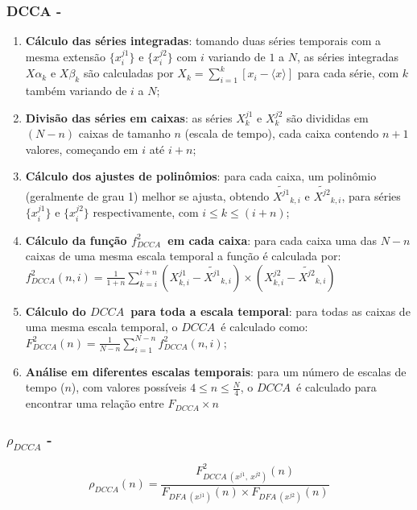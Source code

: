 \documentclass[11pt, aspectratio=169]{beamer}
\newcommand{\pdcca}{\({\rho}_{DCCA}\) }
\newcommand{\dcca}{$DCCA$}
\begin{document}
\begin{frame}[allowframebreaks]
\frametitle{DCCA - \cite{Podobnik2008}}
\begin{enumerate}
    \item \textbf{Cálculo das séries integradas}: tomando duas séries temporais com a mesma extensão $\{x^{j1}_{i}\}$ e $\{x^{j2}_{i}\}$ com $i$ variando de $1$ a $N$,
          as séries integradas $X\alpha_{k}$ e $X\beta_{k}$ são calculadas por
          $X_{k} = \sum_{i=1}^{k}\left[x_{i} - \langle x \rangle \right] $ para cada série, com $k$ também variando de $i$ a $N$;
    \item \textbf{Divisão das séries em caixas}: as séries $X^{j1}_{k}$ e $X^{j2}_{k}$ são divididas em $(N - n)$ caixas de tamanho $n$ (escala de tempo), cada caixa contendo $n + 1$ valores, começando em $i$ até $i + n$;
    \item \textbf{Cálculo dos ajustes de polinômios}: para cada caixa, um polinômio (geralmente de grau 1) melhor se ajusta, obtendo
          $\widetilde{X^{j1}}_{k, i}$ e $\widetilde{X^{j2}}_{k, i}$,
          para séries $\{x^{j1}_{i}\}$ e $\{x^{j2}_{i}\}$ respectivamente,
          com $i \le k \le (i + n)$;
    \item \textbf{Cálculo da função $f_{DCCA}^{2}$~em cada caixa}: para cada caixa uma das $N - n$ caixas de uma mesma escala temporal a função é calculada por:\\[5pt]
     $f_{DCCA}^{2}(n, i) =
            \frac{1}{1+n} \sum_{k=i}^{i + n}(X^{j1}_{k,i}-\widetilde{X^{j1}}_{k, i}) \times (X^{j2}_{k,i}-\widetilde{X^{j2}}_{k, i})$
    \item \textbf{Cálculo do \dcca~para toda a escala temporal}: para todas as caixas de uma mesma escala temporal, o \dcca~é calculado como:\\[5pt]
          $F^2_{DCCA}(n) = \frac{1}{N - n} \sum_{i=1}^{N-n} f_{DCCA}^{2}(n, i)$;
    \item \textbf{Análise em diferentes escalas temporais}: para um número de escalas de tempo ($n$), com valores possíveis $4 \le n \le \frac{N}{4}$, o \dcca~é calculado para encontrar uma relação entre $F_{DCCA} \times n$

\end{enumerate}

\end{frame}

\begin{frame}
\frametitle{\pdcca - \cite{Zebende2011}}

\begin{equation}
  {\rho}_{DCCA}(n) = \frac{F_{DCCA~(x^{j1},~x^{j2})}^{2}(n)}
  {F_{DFA~(x^{j1})}(n) \times F_{DFA~(x^{j2})}(n)}
  \label{eq:p_dcca}
\end{equation}

\end{frame}
\end{document}
